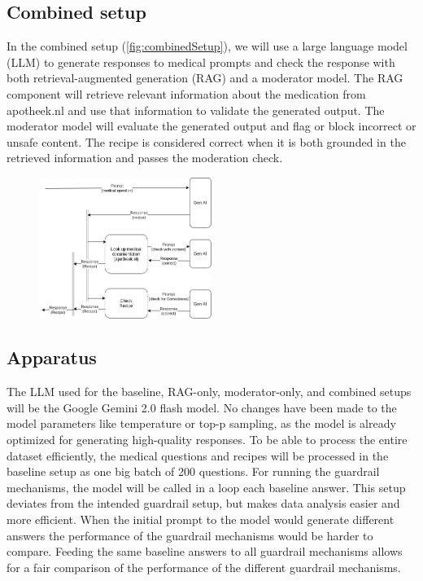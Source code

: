 \subsection{Combined setup}

In the combined setup (\autoref{fig:combinedSetup}), we will use a large language model (LLM) to generate responses to medical prompts and check the response with both retrieval-augmented generation (RAG) and a moderator model.
The RAG component will retrieve relevant information about the medication from apotheek.nl and use that information to validate the generated output.
The moderator model will evaluate the generated output and flag or block incorrect or unsafe content.
The recipe is considered correct when it is both grounded in the retrieved information and passes the moderation check.

\begin{figure}[H]
    \includegraphics[width=0.5\textwidth]{figures/combinedSetup.png}
    \label{fig:combinedSetup}
\end{figure}

\subsection{Apparatus}

The LLM used for the baseline, RAG-only, moderator-only, and combined setups will be the Google Gemini 2.0 flash model.
No changes have been made to the model parameters like temperature or top-p sampling, as the model is already optimized for generating high-quality responses.
To be able to process the entire dataset efficiently, the medical questions and recipes will be processed in the baseline setup as one big batch of 200 questions.
For running the guardrail mechanisms, the model will be called in a loop each baseline answer.
This setup deviates from the intended guardrail setup, but makes data analysis easier and more efficient.
When the initial prompt to the model would generate different answers the performance of the guardrail mechanisms would be harder to compare.
Feeding the same baseline answers to all guardrail mechanisms allows for a fair comparison of the performance of the different guardrail mechanisms.

